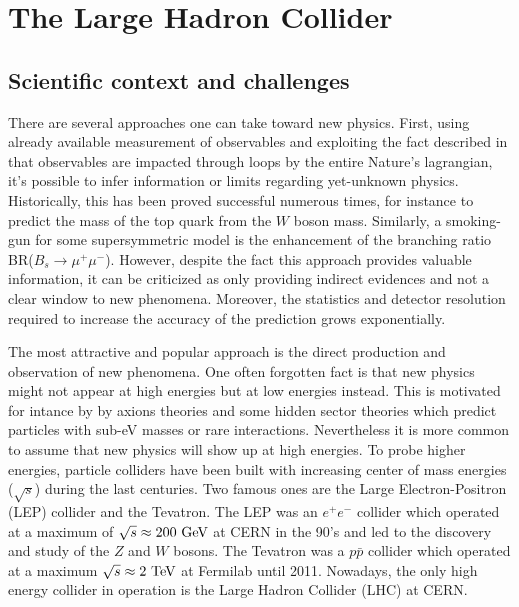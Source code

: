 

    \section{The Large Hadron Collider}

    \subsection{Scientific context and challenges}

    There are several approaches one can take toward new physics. First, using already
    available measurement of observables and exploiting the fact described in 
    that observables are impacted through loops by the entire Nature's lagrangian,
    it's possible to infer information or limits regarding yet-unknown physics. Historically,
    this has been proved successful numerous times, for instance to predict the
    mass of the top quark from the $W$ boson mass. Similarly, a smoking-gun for some
    supersymmetric model is the enhancement of the branching ratio BR($B_s \rightarrow \mu^+\mu^-$).
    However, despite the fact this approach provides valuable information, it can
    be criticized as only providing indirect evidences and not a clear window to new phenomena.
    Moreover, the statistics and detector resolution required to increase the accuracy
    of the prediction grows exponentially.

    The most attractive and popular approach is the direct production and observation of
    new phenomena. One often forgotten fact is that new physics might not appear at high
    energies but at low energies instead. This is motivated for intance by by axions
    theories and some hidden sector theories which predict particles with sub-eV masses
    or rare interactions. Nevertheless it is more common to assume that new physics will
    show up at high energies. To probe higher energies, particle colliders have been
    built with increasing center of mass energies ($\sqrt{s}$) during the last centuries.
    Two famous ones are the Large Electron-Positron (LEP) collider and the Tevatron. The
    LEP was an $e^+e^-$ collider which operated at a maximum of $\sqrt{s} \approx 200~\text{GeV}$
    at CERN in the 90's and led to the discovery and study of the $Z$ and $W$ bosons. The
    Tevatron was a $p\bar{p}$ collider which operated at a maximum $\sqrt{s} \approx 2~\text{TeV}$
    at Fermilab until 2011. Nowadays, the only high energy collider in operation is the
    Large Hadron Collider (LHC) at CERN.

